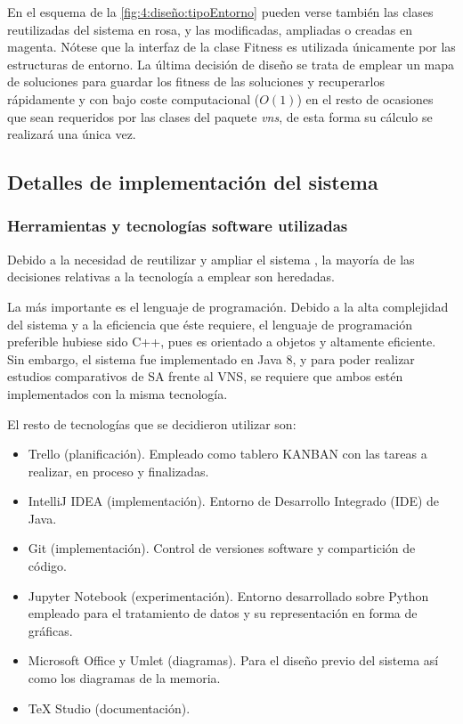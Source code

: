 En el esquema de la \autoref{fig:4:diseño:tipoEntorno} pueden verse también las clases reutilizadas del sistema \legacy{} en rosa, y las modificadas, ampliadas o creadas en magenta. Nótese que la interfaz de la clase Fitness es utilizada únicamente por las estructuras de entorno. La última decisión de diseño se trata de emplear un mapa de soluciones para guardar los fitness de las soluciones y recuperarlos rápidamente y con bajo coste computacional ($O(1)$) en el resto de ocasiones que sean requeridos por las clases del paquete \textit{vns}, de esta forma su cálculo se realizará una única vez.


\subsection{Detalles de implementación del sistema}
\label{sec:4:implementacion}

\subsubsection{Herramientas y tecnologías software utilizadas}

Debido a la necesidad de reutilizar y ampliar el sistema \legacy{}, la mayoría de las decisiones relativas a la tecnología a emplear son heredadas. 

La más importante es el lenguaje de programación. Debido a la alta complejidad del sistema y a la eficiencia que éste requiere, el lenguaje de programación preferible hubiese sido C++, pues es orientado a objetos y altamente eficiente. Sin embargo, el sistema \legacy{} fue implementado en Java 8, y para poder realizar estudios comparativos de SA frente al VNS, se requiere que ambos estén implementados con la misma tecnología.

El resto de tecnologías que se decidieron utilizar son:

\begin{itemize}
	\item Trello (planificación). Empleado como tablero KANBAN con las tareas a realizar, en proceso y finalizadas.
	\item IntelliJ IDEA (implementación). Entorno de Desarrollo Integrado (IDE) de Java.
	\item Git (implementación). Control de versiones software y compartición de código.
	\item Jupyter Notebook (experimentación). Entorno desarrollado sobre Python empleado para el tratamiento de datos y su representación en forma de gráficas.
	\item Microsoft Office y Umlet (diagramas). Para el diseño previo del sistema así como los diagramas de la memoria.
	\item \TeX{} Studio (documentación).
\end{itemize}


